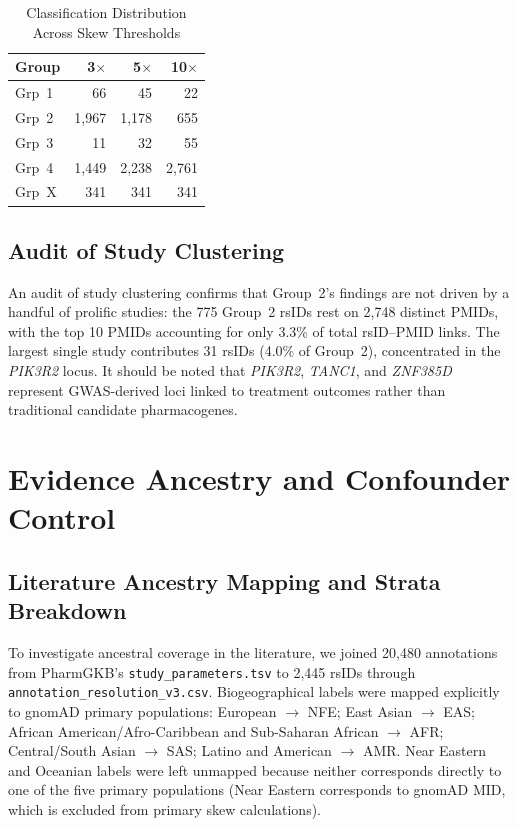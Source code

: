 \documentclass[conference]{IEEEtran}
\begin{document}
\begin{table}[!t]
\begin{table}[!t]
\centering
\caption{Classification Distribution Across Skew Thresholds}
\label{tab:sensitivity}
\renewcommand{\arraystretch}{1.15}
\begin{tabular}{|l|r|r|r|}
\hline
\textbf{Group} & \textbf{3$\times$} & \textbf{5$\times$} & \textbf{10$\times$} \\
\hline
Grp~1 & 66   & 45   & 22   \\
\hline
Grp~2 & 1,967 & 1,178 & 655  \\
\hline
Grp~3 & 11    & 32   & 55   \\
\hline
Grp~4 & 1,449 & 2,238 & 2,761 \\
\hline
Grp~X & 341  & 341  & 341  \\
\hline
\end{tabular}
\end{table}

\subsection{Audit of Study Clustering}

An audit of study clustering confirms that Group~2's findings are not driven by a handful of prolific studies: the 775 Group~2 rsIDs rest on 2,748 distinct PMIDs, with the top 10 PMIDs accounting for only 3.3\% of total rsID--PMID links.
The largest single study contributes 31 rsIDs (4.0\% of Group~2), concentrated in the \textit{PIK3R2} locus.
It should be noted that \textit{PIK3R2}, \textit{TANC1}, and \textit{ZNF385D} represent GWAS-derived loci linked to treatment outcomes rather than traditional candidate pharmacogenes.

\section{Evidence Ancestry and Confounder Control}

\subsection{Literature Ancestry Mapping and Strata Breakdown}

To investigate ancestral coverage in the literature, we joined 20,480 annotations from PharmGKB's \texttt{study\_parameters.tsv} to 2,445 rsIDs through \texttt{annotation\_resolution\_v3.csv}.
Biogeographical labels were mapped explicitly to gnomAD primary populations: European $\to$ NFE; East Asian $\to$ EAS; African American/Afro-Caribbean and Sub-Saharan African $\to$ AFR; Central/South Asian $\to$ SAS; Latino and American $\to$ AMR.
Near Eastern and Oceanian labels were left unmapped because neither corresponds directly to one of the five primary populations (Near Eastern corresponds to gnomAD MID, which is excluded from primary skew calculations).


\end{table}
\end{document}
